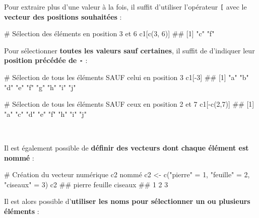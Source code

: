 \documentclass[12pt,twosided, notitlepage]{book}
\newenvironment{Shaded}{}{}
\newcommand{\CommentTok}[1]{\textcolor[rgb]{0.00,0.50,0.00}{#1}}
\newcommand{\DecValTok}[1]{#1}
\newcommand{\KeywordTok}[1]{\textcolor[rgb]{0.00,0.00,1.00}{#1}}
\newcommand{\NormalTok}[1]{#1}
\newcommand{\OperatorTok}[1]{#1}
\newcommand{\StringTok}[1]{\textcolor[rgb]{0.00,0.50,0.50}{#1}}
\renewenvironment{Shaded}{\begin{snugshade}}{\end{snugshade}}
\begin{document}
Pour extraire plus d'une valeur à la fois, il suffit d'utiliser
l'opérateur \texttt{{[}}\index{\texttt{[}|textbf} avec le
\textbf{vecteur des positions souhaitées} :

\begin{Shaded}
\begin{Highlighting}[]
\CommentTok{# Sélection des éléments en position 3 et 6}
\NormalTok{c1[}\KeywordTok{c}\NormalTok{(}\DecValTok{3}\NormalTok{, }\DecValTok{6}\NormalTok{)]}
\NormalTok{  ## [1] "c" "f"}
\end{Highlighting}
\end{Shaded}

Pour sélectionner \textbf{toutes les valeurs sauf certaines}, il suffit
de d'indiquer leur \textbf{position précédée de
\texttt{-}}\index{\texttt{-}} :

\begin{Shaded}
\begin{Highlighting}[]
\CommentTok{# Sélection de tous les éléments SAUF celui en position 3}
\NormalTok{c1[}\OperatorTok{-}\DecValTok{3}\NormalTok{]}
\NormalTok{  ## [1] "a" "b" "d" "e" "f" "g" "h" "i" "j"}

\CommentTok{# Sélection de tous les éléments SAUF ceux en position 2 et 7}
\NormalTok{c1[}\OperatorTok{-}\KeywordTok{c}\NormalTok{(}\DecValTok{2}\NormalTok{,}\DecValTok{7}\NormalTok{)]}
\NormalTok{  ## [1] "a" "c" "d" "e" "f" "h" "i" "j"}
\end{Highlighting}
\end{Shaded}

~

Il est également possible de \textbf{définir des vecteurs dont chaque
élément est nommé} :

\begin{Shaded}
\begin{Highlighting}[]
\CommentTok{# Création du vecteur numérique c2 nommé}
\NormalTok{c2 <-}\StringTok{ }\KeywordTok{c}\NormalTok{(}\StringTok{"pierre"}\NormalTok{ =}\StringTok{ }\DecValTok{1}\NormalTok{, }\StringTok{"feuille"}\NormalTok{ =}\StringTok{ }\DecValTok{2}\NormalTok{, }\StringTok{"ciseaux"}\NormalTok{ =}\StringTok{ }\DecValTok{3}\NormalTok{)}
\NormalTok{c2}
\NormalTok{  ##  pierre feuille ciseaux }
\NormalTok{  ##       1       2       3}
\end{Highlighting}
\end{Shaded}

Il est alors possible d'\textbf{utiliser les noms pour sélectionner un
ou plusieurs éléments} :
\end{document}
